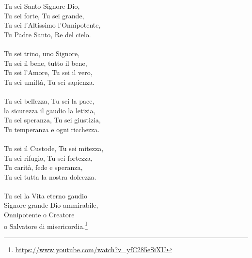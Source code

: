 \begin{haiku}
Tu sei Santo Signore Dio,\\
Tu sei forte, Tu sei grande,\\
Tu sei l'Altissimo l'Onnipotente,\\
Tu Padre Santo, Re del cielo.\\
\leavevmode\\
Tu sei trino, uno Signore,\\
Tu sei il bene, tutto il bene,\\
Tu sei l'Amore, Tu sei il vero,\\
Tu sei umiltà, Tu sei sapienza.\\
\leavevmode\\
Tu sei bellezza, Tu sei la pace,\\
la sicurezza il gaudio la letizia,\\
Tu sei speranza, Tu sei giustizia,\\
Tu temperanza e ogni ricchezza.\\
\leavevmode\\
Tu sei il Custode, Tu sei mitezza,\\
Tu sei rifugio, Tu sei fortezza,\\
Tu carità, fede e speranza,\\
Tu sei tutta la nostra dolcezza.\\
\leavevmode\\
Tu sei la Vita eterno gaudio\\
Signore grande Dio ammirabile,\\
Onnipotente o Creatore\\
    o Salvatore di misericordia.\footnote{\url{https://www.youtube.com/watch?v=yfC285eSiXU}}\\
\end{haiku}
